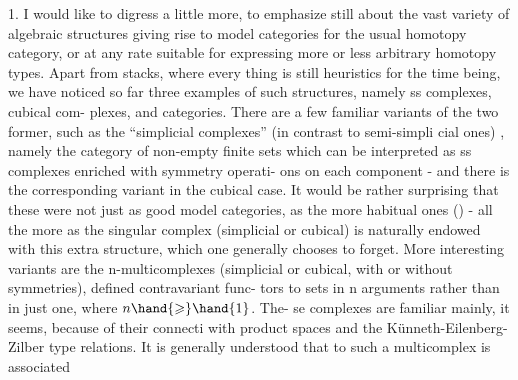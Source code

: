 \margin{$|$}1.  I would like to digress a little more,  to emphasize still about
\margin{$\downarrow$}the vast variety of algebraic structures giving rise to model categories
for the usual homotopy category,  or at any rate suitable for expressing
more or less arbitrary homotopy types.  Apart from stacks,  where every
thing is still heuristics for the time being,  we have noticed so far
three examples of such structures,  namely  ss complexes,  cubical com-%
plexes,  and categories.  There are a  few familiar variants of the two
former,  such as the  ``simplicial complexes'' (in contrast to semi-simpli
cial ones) ,  namely   the category of non-empty finite sets\hand{,}
which can be interpreted as ss complexes enriched with symmetry operati-%
ons on each component  -  and there is the corresponding variant in the
cubical case.  It would be rather surprising that these were not just
as good model categories,  as the more habitual ones () - all the more
as the singular complex (simplicial or cubical) is naturally endowed
with this extra structure,  which one generally chooses to forget. More
interesting variants are the  n-multicomplexes (simplicial or cubical,
with or without symmetries),  defined   contravariant func-%
tors to sets  in n arguments rather than in just one,  where $n\hand{\geqslant}\hand{1}$. The-%
se complexes are familiar mainly,  it seems,  because of their connecti
with product spaces and the Künneth-Eilenberg-Zilber type relations.
It is generally understood that to such a multicomplex is associated

